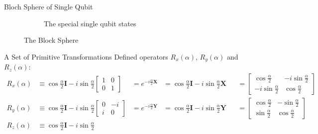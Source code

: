 \documentclass{beamer}
\begin{document}
\begin{frame}{Bloch Sphere of Single Qubit}
{\begin{figure}
\begin{subfigure}[b]{0.5\textwidth}
        \caption{The special single qubit states\tiny\cite{singlequbitstates}}
      \end{subfigure}
      \caption{The Block Sphere}
    \end{figure}
  }%
\end{frame}

\begin{frame}{A Set of Primitive Transformations}
  {\tiny
    Defined operators $R_x(\alpha)$, $R_y(\alpha)$ and $R_z(\alpha)$:
    \begin{align*}
      R_x(\alpha) &\equiv \cos\frac{\alpha}2\mathbf{I} - i\sin\frac{\alpha}2
                                                                     \begin{bmatrix}
                                                                       1 & 0 \\
                                                                       0 & 1
                                                                     \end{bmatrix}
                  &= e^{-i\frac{\alpha}2\mathbf{X}}
                  &= \cos\frac{\alpha}2\mathbf{I} - i\sin\frac{\alpha}2 \mathbf{X}
                  &&=\begin{bmatrix}
                    \cos\frac{\alpha}2 & -i\sin\frac{\alpha}2 \\
                    -i\sin\frac{\alpha}2 & \cos\frac{\alpha}2
                    \end{bmatrix} \\
      R_y(\alpha) &\equiv \cos\frac{\alpha}2\mathbf{I} - i\sin\frac{\alpha}2
                                                                     \begin{bmatrix}
                                                                       0 & -i \\
                                                                       i & 0
                                                                     \end{bmatrix}
                  &= e^{-i\frac{\alpha}2\mathbf{Y}}
                  &= \cos\frac{\alpha}2\mathbf{I} - i\sin\frac{\alpha}2 \mathbf{Y}
                  &&=\begin{bmatrix}
                    \cos\frac{\alpha}2 & -\sin\frac{\alpha}2 \\
                    \sin\frac{\alpha}2 & \cos\frac{\alpha}2
                    \end{bmatrix} \\
      R_z(\alpha) &\equiv \cos\frac{\alpha}2\mathbf{I} - i\sin\frac{\alpha}2

\end{align*}}
\end{frame}
\end{document}
